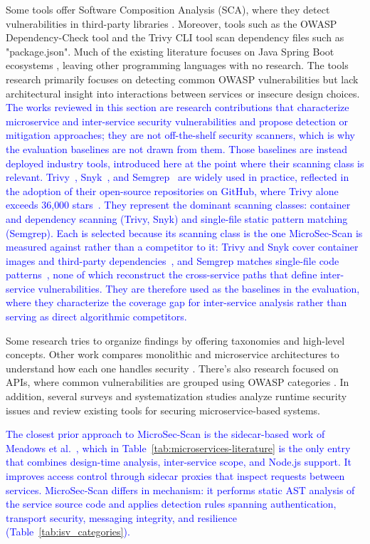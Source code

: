 \documentclass[preprint,12pt]{elsarticle}
\newcommand{\new}[1]{\textcolor{blue}{#1}}
\begin{document}
Some tools offer Software Composition Analysis (SCA), where they detect vulnerabilities in third-party libraries \cite{ali2024sca}. Moreover, tools such as the OWASP Dependency-Check tool and the Trivy CLI tool scan dependency files such as "package.json". Much of the existing literature focuses on Java Spring Boot ecosystems \cite{abdurrahman2024securemarketplace}, leaving other programming languages with no research. The tools research primarily focuses on detecting common OWASP vulnerabilities but lack architectural insight into interactions between services or insecure design choices. \new{The works reviewed in this section are research contributions that
characterize microservice and inter-service security vulnerabilities and
propose detection or mitigation approaches; they are not off-the-shelf
security scanners, which is why the evaluation baselines are not drawn from
them. Those baselines are instead deployed industry tools, introduced here
at the point where their scanning class is relevant. Trivy~\cite{trivy},
Snyk~\cite{snyk}, and Semgrep~\cite{semgrep} are widely used in practice,
reflected in the adoption of their open-source repositories on GitHub, where
Trivy alone exceeds 36{,}000 stars~\cite{trivy_repo}. They represent the
dominant scanning classes: container and dependency scanning (Trivy, Snyk)
and single-file static pattern matching (Semgrep). Each is
selected because its scanning class is the one MicroSec-Scan is measured
against rather than a competitor to it: Trivy and Snyk cover container
images and third-party dependencies~\cite{trivy,snyk}, and Semgrep matches
single-file code patterns~\cite{semgrep}, none of which reconstruct the
cross-service paths that define inter-service vulnerabilities. They are
therefore used as the baselines in the evaluation, where they characterize
the coverage gap for inter-service analysis rather than serving as direct
algorithmic competitors.}

Some research tries to organize findings by offering taxonomies and high-level concepts. Other work compares monolithic and microservice architectures to understand how each one handles security \cite{nemmini2023fortifying}. There’s also research focused on APIs, where common vulnerabilities are grouped using OWASP categories \cite{nawrocki2024vulnerabilities}. In addition, several surveys and systematization studies analyze runtime security issues and review existing tools for securing microservice-based systems\cite{minna2023runtime,haindl2024systematic,gorige2020privacy}.

\new{The closest prior approach to MicroSec-Scan is the sidecar-based work of Meadows et al.~\cite{meadows2023sidecar}, which in Table~\ref{tab:microservices-literature} is the only entry that combines design-time analysis, inter-service scope, and Node.js support. It improves access control through sidecar proxies that inspect requests between services. MicroSec-Scan differs in mechanism: it performs static AST analysis of the service source code and applies detection rules spanning authentication, transport security, messaging integrity, and resilience (Table~\ref{tab:isv_categories}).}
\end{document}
